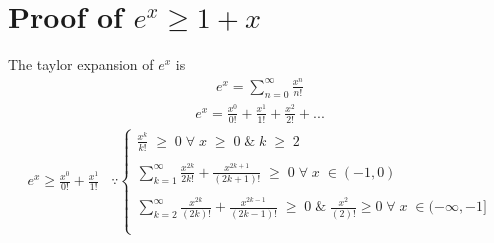 \documentclass[11pt]{article}
\begin{document}
\section{Proof of $e^x \ge 1 + x$} \label{appendix: ex}

The taylor expansion of $e^x$ is
\begin{align*}
	e^x = \sum_{n = 0}^{\infty} \frac{x^n}{n!}
\end{align*}
\begin{align*}
	e^x = \frac{x^0}{0!} + \frac{x^1}{1!} + \frac{x^2}{2!} + ... 
\end{align*} 
\begin{align*}
	e^x \ge \frac{x^0}{0!} + \frac{x^1}{1!}  \;\;\;\because
	\begin{cases}
			\frac{x^k}{k!} \;\ge\; 0 \;\forall\;x \; \ge \;0 \;\& \; k\; \ge\; 2\; \\ \\
		\sum_{k = 1}^{\infty}\frac{x^{2k}}{2k!} + \frac{x^{2k+1}}{(2k+1)!}\; \ge \; 0 \; \forall \; x \; \in (-1, 0) \\ \\ 
		\sum_{k = 2}^{\infty}\frac{x^{2k}}{(2k)!} + \frac{x^{2k-1}}{(2k-1)!}\; \ge \; 0 \;\&\; \frac{x^{2}}{(2)!} \ge 0\; \forall \; x \; \in (-\infty, -1] \\ \\
	  \end{cases}    
\end{align*}
		

\end{document}
